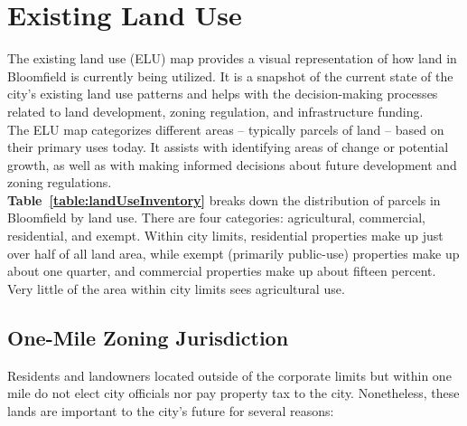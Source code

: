 \section{Existing Land Use}

\noindent The existing land use (ELU) map provides a visual representation of how land in Bloomfield is currently being utilized. It is a snapshot of the current state of the city's existing land use patterns and helps with the decision-making processes related to land development, zoning regulation, and infrastructure funding.\\

\noindent The ELU map categorizes different areas -- typically parcels of land -- based on their primary uses today. It assists with identifying areas of change or potential growth, as well as with making informed decisions about future development and zoning regulations.\\



\pagebreak
\noindent \textbf{Table~\ref{table:landUseInventory}} breaks down the distribution of parcels in Bloomfield by land use. There are four categories: agricultural, commercial, residential, and exempt. Within city limits, residential properties make up just over half of all land area, while exempt (primarily public-use) properties make up about one quarter, and commercial properties make up about fifteen percent. Very little of the area within city limits sees agricultural use.

\subsection*{One-Mile Zoning Jurisdiction}

\noindent Residents and landowners located outside of the corporate limits but within one mile do not elect city officials nor pay property tax to the city. Nonetheless, these lands are important to the city's future for several reasons:

